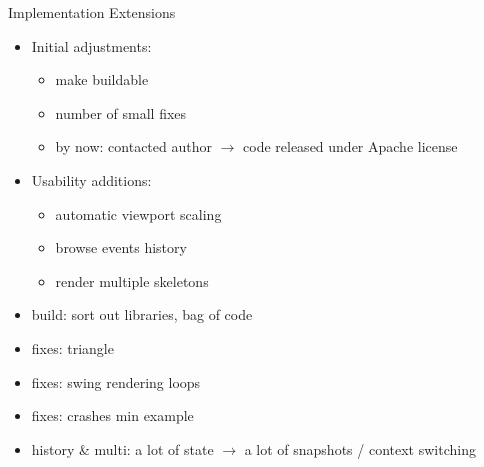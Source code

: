 \documentclass[
  size=9pt,
  style=klope,
  paper=screen,
  mode=print,
  display=slides,
  nohandoutpagebreaks,
  pauseslide,
  hlsections,
  fleqn,
  dvips,
  clock
]{powerdot}
\begin{document}
\begin{slide}{Implementation Extensions}
  \begin{itemize}

    \item Initial adjustments:
    \begin{itemize}
      \item make buildable
      \item number of small fixes
      \item by now: contacted author $\rightarrow$ code released under Apache license
    \end{itemize}

    \item Usability additions:
    \begin{itemize}
      \item automatic viewport scaling
      \item browse events history
      \item render multiple skeletons
    \end{itemize}

  \end{itemize}
\end{slide}
\begin{note}{}
  \begin{itemize}
    \item build: sort out libraries, bag of code
    \item fixes: triangle
    \item fixes: swing rendering loops
    \item fixes: crashes min example
    \item history \& multi: a lot of state $\rightarrow$ a lot of snapshots / context switching
  \end{itemize}
\end{note}
\end{document}
